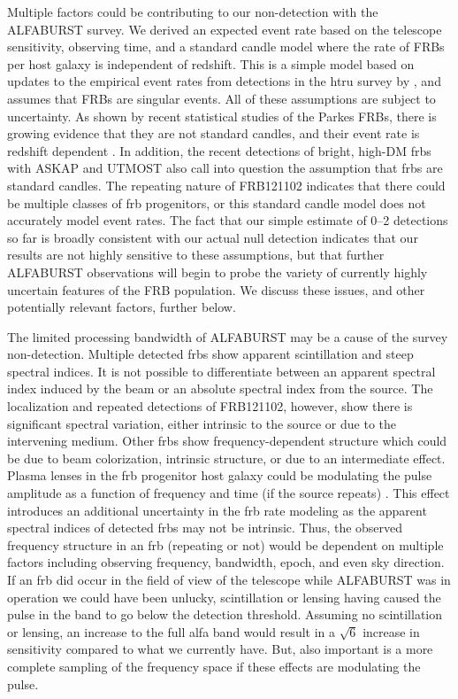 \documentclass[a4paper,fleqn,usenatbib]{mnras}
\begin{document}
Multiple factors could be contributing to our non-detection with the ALFABURST
survey. We derived an expected event rate based on the telescope sensitivity,
observing time, and a standard candle model \citep{2013MNRAS.436L...5L} where
the rate of FRBs per host galaxy is independent of redshift. This is a simple
model based on updates to the empirical event rates from detections in the
\gls{htru} survey \citep{2013Sci...341...53T} by \cite{2016MNRAS.460.3370C}, and
assumes that FRBs are singular events. All of these assumptions are subject to
uncertainty. As shown by recent statistical studies of the Parkes FRBs, there is
growing evidence that they are not  standard candles, and their event rate is
redshift dependent \citep{2016MNRAS.458..708C,ranethesis}.  In addition, the
recent detections of bright, high-DM \glspl{frb} with ASKAP
\citep{2017ApJ...841L..12B} and UTMOST \citep{2017MNRAS.468.3746C,atel10697}
also call into question the assumption that \glspl{frb} are  standard candles.
The repeating nature of FRB121102 \citep{2016Natur.531..202S} indicates that
there could be multiple classes of \gls{frb} progenitors, or this standard
candle model does not accurately model event rates. The fact that our simple
estimate of 0--2 detections so far is broadly consistent with our actual null
detection indicates that our results are not highly sensitive to these
assumptions, but that further ALFABURST observations will begin to probe the
variety of currently highly uncertain features of the FRB population. We discuss
these issues, and other potentially relevant factors, further below.

The limited processing bandwidth of ALFABURST may be a cause of the survey
non-detection. Multiple detected \glspl{frb} show apparent scintillation and
steep spectral indices. It is not possible to differentiate between an apparent
spectral index induced by the beam or an absolute spectral index from the
source. The localization and repeated detections of FRB121102, however, show there
is significant spectral variation, either intrinsic to the source or due to the intervening
medium. Other \glspl{frb} show frequency-dependent structure which could be due
to beam colorization, intrinsic structure, or due to an intermediate effect. Plasma
lenses in the \gls{frb} progenitor host galaxy could be modulating the pulse
amplitude as a function of frequency and time (if the source repeats)
\citep{2017ApJ...842...35C}. This effect introduces an additional uncertainty in
the \gls{frb} rate modeling as the apparent spectral indices of detected
\glspl{frb} may not be intrinsic. Thus, the observed frequency structure in an
\gls{frb} (repeating or not) would be dependent on multiple factors including
observing frequency, bandwidth, epoch, and even sky direction. If an \gls{frb}
did occur in the field of view of the telescope while ALFABURST was in operation
we could have been unlucky, scintillation or lensing having caused the pulse in the
band to go below the detection threshold. Assuming no scintillation or lensing,
an increase to the full \gls{alfa} band would result in a $\sqrt{6}$ increase in
sensitivity compared to what we currently have. But, also important is a more complete sampling of the frequency
space if these effects are modulating the pulse.
\end{document}

